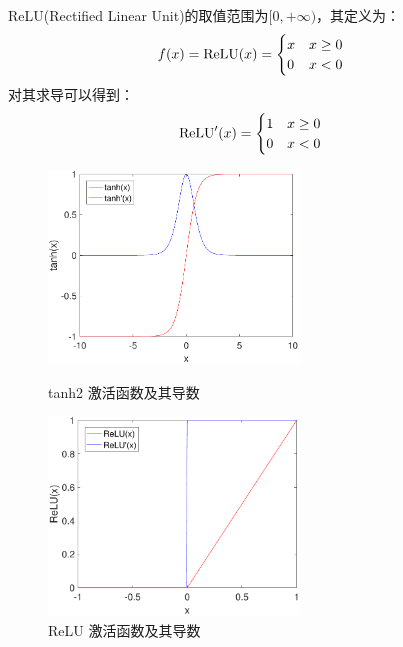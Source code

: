 ReLU(Rectified Linear Unit)的取值范围为$[0,+\infty)$，其定义为：
\begin{align}
f(x)&={\rm ReLU}(x)=\begin{cases}
      x & x\geq 0 \\
      0& x<0
   \end{cases}\;
\end{align}
对其求导可以得到：
\begin{align}
{\rm ReLU}'(x)&=\begin{cases}
      1 & x\geq 0 \\
      0 & x<0
   \end{cases}\;
\end{align}


\begin{figure}[hbt]
	\centering
	\begin{minipage}{7cm}
		\includegraphics[width=6.67cm]{figures/networks/tanh2}
    \caption{tanh2 激活函数及其导数}
    \label{fig:tanh2}

	\end{minipage}
	\hspace{10pt}
	\begin{minipage}{7cm}
		\includegraphics[width=6.67cm]{figures/networks/ReLU}
    \caption{ReLU 激活函数及其导数}
    \label{fig:ReLU}

	\end{minipage}

\end{figure}

